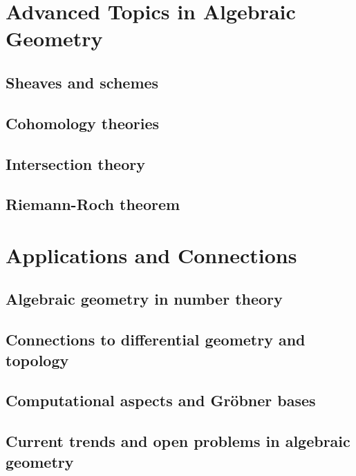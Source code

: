\documentclass{article}
\begin{document}
\clearpage
\section{Advanced Topics in Algebraic Geometry}
\subsection{Sheaves and schemes}
\subsection{Cohomology theories}
\subsection{Intersection theory}
\subsection{Riemann-Roch theorem}






\clearpage
\section{Applications and Connections}
\subsection{Algebraic geometry in number theory}
\subsection{Connections to differential geometry and topology}
\subsection{Computational aspects and Gr\"{o}bner bases}
\subsection{Current trends and open problems in algebraic geometry}














\newpage





\end{document}
